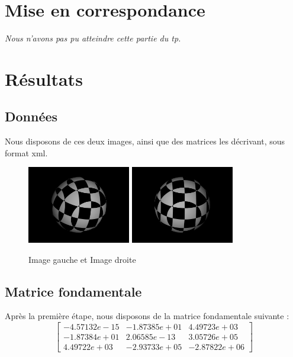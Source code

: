 \documentclass[a4paper]{article}
\begin{document}
\section{Mise en correspondance}

{\em Nous n'avons pas pu atteindre cette partie du tp.}

\clearpage

\section{Résultats}

\subsection{Données}

Nous disposons de ces deux images, ainsi que des matrices les décrivant, sous format xml.
\begin{figure}[h]
\begin{center}
\includegraphics[width=170px]{left.png}
\includegraphics[width=170px]{right.png}
\end{center}
\caption{Image gauche et Image droite}
\end{figure}

\subsection{Matrice fondamentale}

Après la première étape, nous disposons de la matrice fondamentale suivante :
\begin{equation}
  \begin{bmatrix}
    -4.57132e-15 & -1.87385e+01 &  4.49723e+03\\
    -1.87384e+01 &  2.06585e-13 &  3.05726e+05\\
    4.49722e+03 & -2.93733e+05 & -2.87822e+06
  \end{bmatrix}
\end{equation}
\end{document}
